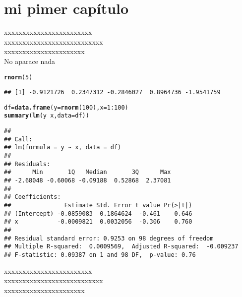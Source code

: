 \documentclass[oneside,svgnames,x11names,x11names,HTML,twoside]{libro-est}\usepackage[]{graphicx}\usepackage[]{color}
\makeatletter
\newcommand{\hlnum}[1]{\textcolor[rgb]{0.686,0.059,0.569}{#1}}%
\newcommand{\hlopt}[1]{\textcolor[rgb]{0,0,0}{#1}}%
\newcommand{\hlstd}[1]{\textcolor[rgb]{0.345,0.345,0.345}{#1}}%
\newcommand{\hlkwb}[1]{\textcolor[rgb]{0.69,0.353,0.396}{#1}}%
\newcommand{\hlkwc}[1]{\textcolor[rgb]{0.333,0.667,0.333}{#1}}%
\newcommand{\hlkwd}[1]{\textcolor[rgb]{0.737,0.353,0.396}{\textbf{#1}}}%
\newenvironment{kframe}{%
 \def\at@end@of@kframe{}%
 \ifinner\ifhmode%
  \def\at@end@of@kframe{\end{minipage}}%
  \begin{minipage}{\columnwidth}%
 \fi\fi%
 \def\FrameCommand##1{\hskip\@totalleftmargin \hskip-\fboxsep
 \colorbox{shadecolor}{##1}\hskip-\fboxsep
     \hskip-\linewidth \hskip-\@totalleftmargin \hskip\columnwidth}%
 \MakeFramed {\advance\hsize-\width
   \@totalleftmargin\z@ \linewidth\hsize
   \@setminipage}}%
 {\par\unskip\endMakeFramed%
 \at@end@of@kframe}
\newenvironment{knitrout}{}{} %
\makeatother
\begin{document}
\chapter{mi pimer cap\'itulo}
xxxxxxxxxxxxxxxxxxxxxxxx\\
xxxxxxxxxxxxxxxxxxxxxxxxxxx\\
xxxxxxxxxxxxxxxxxxxxxx\\

No aparace nada
\begin{knitrout}
\color{fgcolor}\begin{kframe}
\begin{alltt}
\hlkwd{rnorm}\hlstd{(}\hlnum{5}\hlstd{)}
\end{alltt}
\begin{verbatim}
## [1] -0.9121726  0.2347312 -0.2846027  0.8964736 -1.9541759
\end{verbatim}
\begin{alltt}
\hlstd{df}\hlkwb{=}\hlkwd{data.frame}\hlstd{(}\hlkwc{y}\hlstd{=}\hlkwd{rnorm}\hlstd{(}\hlnum{100}\hlstd{),} \hlkwc{x}\hlstd{=}\hlnum{1}\hlopt{:}\hlnum{100}\hlstd{)}
\hlkwd{summary}\hlstd{(}\hlkwd{lm}\hlstd{(y}\hlopt{~}\hlstd{x,} \hlkwc{data}\hlstd{=df))}
\end{alltt}
\begin{verbatim}
## 
## Call:
## lm(formula = y ~ x, data = df)
## 
## Residuals:
##      Min       1Q   Median       3Q      Max 
## -2.68048 -0.60068 -0.09188  0.52868  2.37081 
## 
## Coefficients:
##               Estimate Std. Error t value Pr(>|t|)
## (Intercept) -0.0859083  0.1864624  -0.461    0.646
## x           -0.0009821  0.0032056  -0.306    0.760
## 
## Residual standard error: 0.9253 on 98 degrees of freedom
## Multiple R-squared:  0.0009569,	Adjusted R-squared:  -0.009237 
## F-statistic: 0.09387 on 1 and 98 DF,  p-value: 0.76
\end{verbatim}
\end{kframe}
\end{knitrout}

xxxxxxxxxxxxxxxxxxxxxxxx\\
xxxxxxxxxxxxxxxxxxxxxxxxxxx\\
xxxxxxxxxxxxxxxxxxxxxx\\
\end{document}
